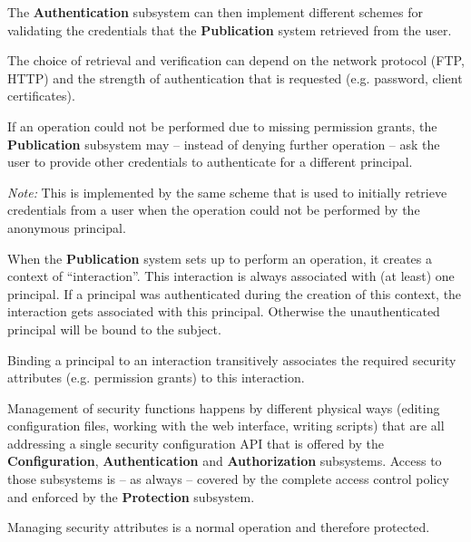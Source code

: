 \documentclass[12pt,english]{scrbook}
\begin{document}
The \textbf{Authentication} subsystem can then implement different schemes for
validating the credentials that the \textbf{Publication} system retrieved from
the user.

The choice of retrieval and verification can depend on the network protocol
(FTP, HTTP) and the strength of authentication that is requested (e.g. password,
client certificates).


If an operation could not be performed due to missing permission grants, the
\textbf{Publication} subsystem may -- instead of denying further operation --
ask the user to provide other credentials to authenticate for a different
principal.

\emph{Note:} This is implemented by the same scheme that is used to initially
retrieve credentials from a user when the operation could not be performed by
the anonymous principal.


When the \textbf{Publication} system sets up to perform an operation, it
creates a context of ``interaction''. This interaction is always associated
with (at least) one principal. If a principal was authenticated during the
creation of this context, the interaction gets associated with this principal.
Otherwise the unauthenticated principal will be bound to the subject.

Binding a principal to an interaction transitively associates the required security
attributes (e.g. permission grants) to this interaction.


Management of security functions happens by different physical ways (editing
configuration files, working with the web interface, writing scripts) that are
all addressing a single security configuration API that is offered by the
\textbf{Configuration}, \textbf{Authentication} and \textbf{Authorization}
subsystems. Access to those subsystems is -- as always -- covered by the
complete access control policy and enforced by the \textbf{Protection}
subsystem.


Managing security attributes is a normal operation and therefore protected.

\end{document}
